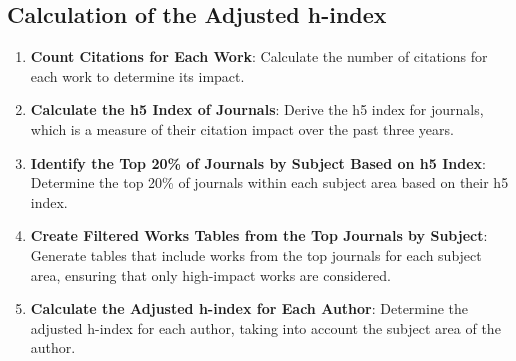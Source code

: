 \subsection{Calculation of the Adjusted h-index}

%
\begin{enumerate}
      \item \textbf{Count Citations for Each Work}: Calculate the number of citations for each work to determine its impact.

      \item \textbf{Calculate the h5 Index of Journals}: Derive the h5 index for journals, which is a
            measure of their citation impact over the past three years.

      \item \textbf{Identify the Top 20\% of Journals by Subject Based on h5 Index}: Determine the top 20\% of journals within
            each subject area based on their h5 index.

      \item \textbf{Create Filtered Works Tables from the Top Journals by Subject}: Generate tables that include works from the
            top journals for each subject area, ensuring that only high-impact works are considered.


      \item \textbf{Calculate the Adjusted h-index for Each Author}: Determine the adjusted h-index for each author,
            taking into account the subject area of the author.
\end{enumerate}

